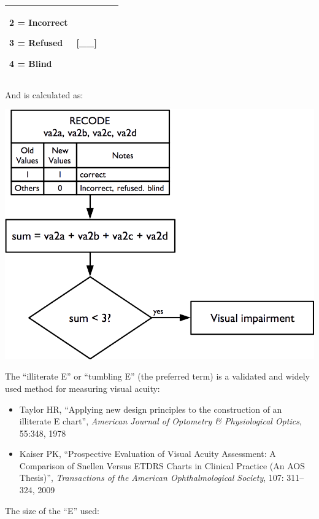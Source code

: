 \documentclass[12pt,a4paper]{book}
\theoremstyle{definition}
\theoremstyle{definition}
\theoremstyle{definition}
\theoremstyle{remark}
\begin{document}
\begin{longtable}[]{@{}llll@{}}
\begin{minipage}[t]{0.24\columnwidth}
2 = Incorrect

3 = Refused

4 = Blind\strut
\end{minipage} & \begin{minipage}[t]{0.24\columnwidth}\raggedright
{[}\_\_{]}\strut
\end{minipage}\tabularnewline
\bottomrule
\end{longtable}

And is calculated as:

\begin{center}\includegraphics{figures/indicators27} \end{center}

The ``illiterate E'' or ``tumbling E'' (the preferred term) is a
validated and widely used method for measuring visual acuity:

\begin{itemize}
\item
  Taylor HR, ``Applying new design principles to the construction of an
  illiterate E chart'', \emph{American Journal of Optometry \&
  Physiological Optics}, 55:348, 1978
\item
  Kaiser PK, ``Prospective Evaluation of Visual Acuity Assessment: A
  Comparison of Snellen Versus ETDRS Charts in Clinical Practice (An AOS
  Thesis)'', \emph{Transactions of the American Ophthalmological
  Society}, 107: 311--324, 2009
\end{itemize}

The size of the ``E'' used:
\end{document}
